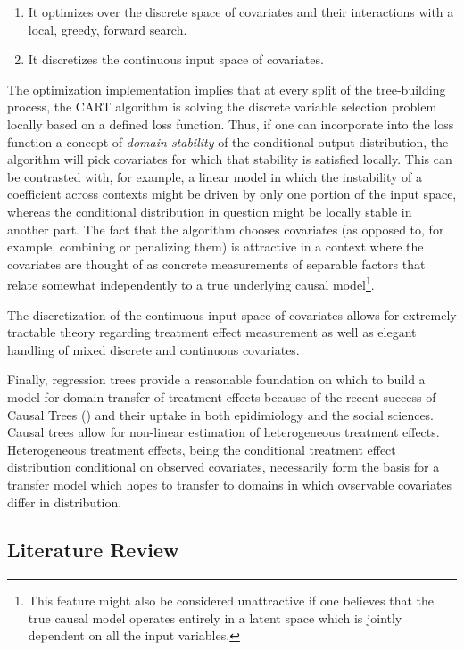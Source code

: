 \documentclass[a4paper,12pt]{article}
\begin{document}
\begin{enumerate}
\item It optimizes over the discrete space of covariates and their interactions with a local, greedy, forward search.
\item It discretizes the continuous input space of covariates.
\end{enumerate}

The optimization implementation implies that at every split of the tree-building process, the CART algorithm is solving the discrete variable selection problem locally based on a defined loss function. Thus, if one can incorporate into the loss function a concept of \textit{domain stability} of the conditional output distribution, the algorithm will pick covariates for which that stability is satisfied locally. This can be contrasted with, for example, a linear model in which the instability of a coefficient across contexts might be driven by only one portion of the input space, whereas the conditional distribution in question might be locally stable in another part. The fact that the algorithm chooses covariates (as opposed to, for example, combining or penalizing them) is attractive in a context where the covariates are thought of as concrete measurements of separable factors that relate somewhat independently to a true underlying causal model\footnote{This feature might also be considered unattractive if one believes that the true causal model operates entirely in a latent space which is jointly dependent on all the input variables.}.

The discretization of the continuous input space of covariates allows for extremely tractable theory regarding treatment effect measurement as well as elegant handling of mixed discrete and continuous covariates.

Finally, regression trees provide a reasonable foundation on which to build a model for domain transfer of treatment effects because of the recent success of Causal Trees (\cite{Athey2016}) and their uptake in both epidimiology and the social sciences. Causal trees allow for non-linear estimation of heterogeneous treatment effects. Heterogeneous treatment effects, being the conditional treatment effect distribution conditional on observed covariates, necessarily form the basis for a transfer model which hopes to transfer to domains in which ovservable covariates differ in distribution.


\subsection{ Literature Review }
\end{document}
